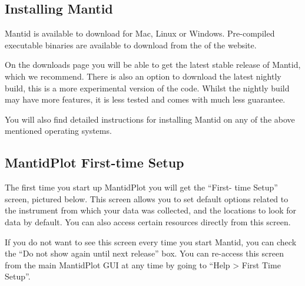 \documentclass[letterpaper,10pt,english,openany]{sphinxmanual}
\let\sphinxpxdimen\pdfpxdimen\else\newdimen\sphinxpxdimen
\begin{document}
\subsection{Installing Mantid}
\label{\detokenize{mantid_basic_course/getting_started/getting_started:installing-mantid}}
Mantid is available to download for Mac, Linux or Windows. Pre-compiled executable binaries are available to download from the
 of the website.

On the downloads page you will be able to get the latest stable release of Mantid, which we recommend. There is also an option
to download the latest nightly build, this is a more experimental version of the code. Whilst the nightly build may have more
features, it is less tested and comes with much less guarantee.

You will also find detailed instructions for installing Mantid on any of the above mentioned operating systems.

\begin{figure}[H]
\centering

\noindent\sphinxincludegraphics[width=500\sphinxpxdimen]{{MantidDownload_3121}.png}
\end{figure}


\subsection{MantidPlot First-time Setup}
\label{\detokenize{mantid_basic_course/getting_started/getting_started:mantidplot-first-time-setup}}
The first time you start up MantidPlot you will get the “First-
time Setup” screen, pictured below. This screen allows you to set
default options related to the instrument from which your data
was collected, and the locations to look for data by default. You
can also access certain resources directly from this screen.

If you do not want to see this screen every time you start
Mantid, you can check the “Do not show again until next release”
box. You can re-access this screen from the main MantidPlot GUI
at any time by going to “Help \textgreater{} First Time Setup”.
\end{document}
